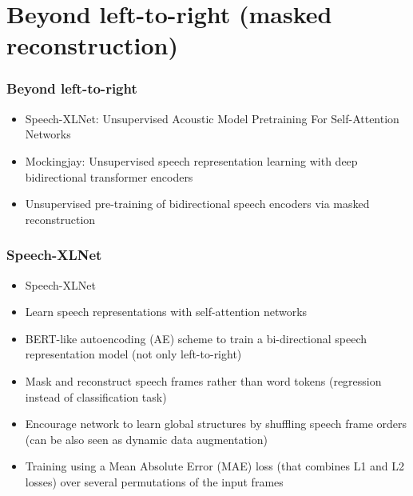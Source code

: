 \documentclass[table]{beamer}
\begin{document}
\section{Beyond left-to-right (masked reconstruction)}

\begin{frame}
\frametitle{Beyond left-to-right}

		\begin{itemize}
			\item Speech-XLNet: Unsupervised Acoustic Model Pretraining For Self-Attention Networks \citep{song2019speechxlnet}
			\item Mockingjay: Unsupervised speech representation learning with deep bidirectional transformer encoders \citep{Liu_2020}
			\item Unsupervised pre-training of bidirectional speech encoders via masked reconstruction \citep{wang2020unsupervised}
		\end{itemize} 



\end{frame}


\begin{frame}
\frametitle{Speech-XLNet }

		\begin{itemize}
			\item Speech-XLNet \citep{song2019speechxlnet}
			\item Learn speech representations with self-attention networks 
			\item BERT-like autoencoding (AE) scheme to train a bi-directional speech representation model (not only left-to-right)
			\item Mask and reconstruct speech frames rather than word tokens (regression instead of classification task)
			\item Encourage network to learn global structures by shuffling speech frame orders (can be also seen as dynamic data augmentation)
			\item Training using a Mean Absolute Error (MAE) loss (that combines L1 and L2 losses) over several permutations of the input frames
		\end{itemize} 
\end{frame}
\end{document}
